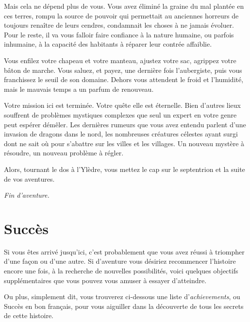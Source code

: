\documentclass{report}
\newcommand{\theend}{\emph{Fin d'aventure.}}
\begin{document}
Mais cela ne dépend plus de vous. Vous avez éliminé la graine du mal plantée en ces terres, rompu la source de pouvoir qui permettait au anciennes horreurs de toujours renaître de leurs cendres, condamnait les choses à ne jamais évoluer. Pour le reste, il va vous falloir faire confiance à la nature humaine, ou parfois inhumaine, à la capacité des habitants à réparer leur contrée affaiblie. 

Vous enfilez votre chapeau et votre manteau, ajustez votre sac, agrippez votre bâton de marche. Vous saluez, et payez, une dernière fois l'aubergiste, puis vous franchissez le seuil de son domaine. Dehors vous attendent le froid et l'humidité, mais le mauvais temps a un parfum de renouveau. 

Votre mission ici est terminée. Votre quête elle est éternelle. Bien d'autres lieux souffrent de problèmes mystiques complexes que seul un expert en votre genre peut espérer démêler. Les dernières rumeurs que vous avez entendu parlent d'une invasion de dragons dans le nord, les nombreuses créatures célestes ayant surgi dont ne sait où pour s'abattre sur les villes et les villages. Un nouveau mystère à résoudre, un nouveau problème à régler. 

Alors, tournant le dos à l'Ylèdre, vous mettez le cap sur le septentrion et la suite de vos aventures.

\theend

\chapter{Succès}

Si vous êtes arrivé jusqu'ici, c'est probablement que vous avez réussi à triompher d'une façon ou d'une autre. Si d'aventure vous désiriez recommencer l'histoire encore une fois, à la recherche de nouvelles possibilités, voici quelques objectifs supplémentaires que vous pouvez vous amuser à essayer d'atteindre.

Ou plus, simplement dit, vous trouverez ci-dessous une liste d'\emph{achievements}, ou Succès en bon français, pour vous aiguiller dans la découverte de tous les secrets de cette histoire.
\end{document}
